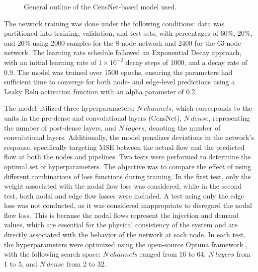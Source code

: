 \begin{itemize}
\begin{figure}
    \centering
    \setlength{}        
    \setlength{}
    \resizebox{\figurewidth}{\figureheight}{}
    \caption{General outline of the CensNet-based model used.}
    \label{fig:model_description}
\end{figure}
\end{itemize}


The network training was done under the following conditions: data was partitioned into training, validation, and test sets, with percentages of 60\%, 20\%, and 20\% using 2000 samples for the 8-node network and 2400 for the 63-node network. The learning rate schedule followed an Exponential Decay approach, with an initial learning rate of $1 \times 10^{-2}$ decay steps of 1000, and a decay rate of 0.9. The model was trained over 1500 epochs, ensuring the parameters had sufficient time to converge for both node- and edge-level predictions using a Leaky Relu activation function with an alpha parameter of 0.2.


The model utilized three hyperparameters: $N \ channels$, which corresponds to the units in the pre-dense and convolutional layers (CensNet), $N \ dense$, representing the number of post-dense layers, and $N \ layers$, denoting the number of convolutional layers. Additionally, the model penalizes deviations in the network's response, specifically targeting MSE between the actual flow and the predicted flow at both the nodes and pipelines. Two tests were performed to determine the optimal set of hyperparameters. The objective was to compare the effect of using different combinations of loss functions during training. In the first test, only the weight associated with the nodal flow loss was considered, while in the second test, both nodal and edge flow losses were included. A test using only the edge loss was not conducted, as it was considered inappropriate to disregard the nodal flow loss. This is because the nodal flows represent the injection and demand values, which are essential for the physical consistency of the system and are directly associated with the behavior of the network at each node. In each test, the hyperparameters were optimized using the open-source Optuna framework \cite{optuna_2019}, with the following search space: $N \ channels$ ranged from 16 to 64, $N \ layers$ from 1 to 5, and $N \ dense$ from 2 to 32.


